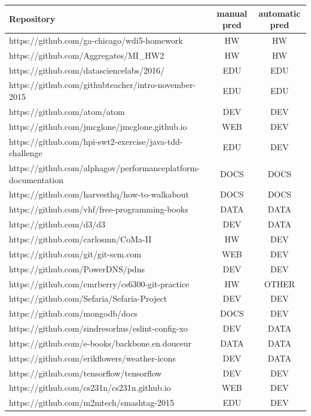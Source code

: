 \documentclass[a4paper]{scrartcl}
\begin{document}
\begin{center}
	\begin{tabular}{ l | c | c }
		\hline
		Repository & manual pred & automatic pred \\ \hline
		https://github.com/ga-chicago/wdi5-homework & HW & HW \\ \hline
		https://github.com/Aggregates/MI\_HW2 & HW & HW \\ \hline
		https://github.com/datasciencelabs/2016/ & EDU & EDU \\ \hline
		https://github.com/githubteacher/intro-november-2015 & EDU & EDU \\ \hline
		https://github.com/atom/atom & DEV & DEV \\ \hline
		https://github.com/jmcglone/jmcglone.github.io & WEB & DEV \\ \hline
		https://github.com/hpi-swt2-exercise/java-tdd-challenge & EDU & DEV \\ \hline
		https://github.com/alphagov/performanceplatform-documentation & DOCS & DOCS \\ \hline
		https://github.com/harvesthq/how-to-walkabout & DOCS & DOCS \\ \hline
		https://github.com/vhf/free-programming-books & DATA & DATA \\ \hline
		https://github.com/d3/d3 & DEV & DATA \\ \hline
		https://github.com/carlosmn/CoMa-II & HW & DEV \\ \hline
		https://github.com/git/git-scm.com & WEB & DEV \\ \hline
		https://github.com/PowerDNS/pdns & DEV & DEV \\ \hline
		https://github.com/cmrberry/cs6300-git-practice & HW & OTHER \\ \hline
		https://github.com/Sefaria/Sefaria-Project & DEV & DEV \\ \hline
		https://github.com/mongodb/docs & DOCS & DEV \\ \hline
		https://github.com/sindresorhus/eslint-config-xo & DEV & DATA \\ \hline
		https://github.com/e-books/backbone.en.douceur & DATA & DATA \\ \hline
		https://github.com/erikflowers/weather-icons & DEV & DATA \\ \hline
		https://github.com/tensorflow/tensorflow & DEV & DEV \\ \hline
		https://github.com/cs231n/cs231n.github.io & WEB & DEV \\ \hline
		https://github.com/m2mtech/smashtag-2015 & EDU & DEV \\ \hline

\end{tabular}
\end{center}
\end{document}
